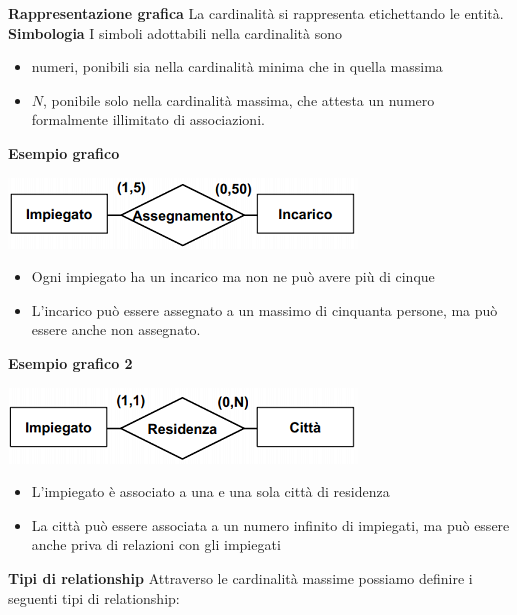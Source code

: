 \noindent \textbf{Rappresentazione grafica} La cardinalità si rappresenta etichettando le entità.\\
\textbf{Simbologia} I simboli adottabili nella cardinalità sono
\begin{itemize}
	\item numeri, ponibili sia nella cardinalità minima che in quella massima
	\item $N$, ponibile solo nella cardinalità massima, che attesta un numero formalmente illimitato di associazioni.
\end{itemize}
\textbf{Esempio grafico} \begin{center}\includegraphics{images/14.PNG}\end{center}
\begin{itemize}
	\item Ogni impiegato ha un incarico ma non ne può avere più di cinque
	\item L'incarico può essere assegnato a un massimo di cinquanta persone, ma può essere anche non assegnato.
\end{itemize}
\textbf{Esempio grafico 2} \begin{center}\includegraphics{images/15.PNG}\end{center}
\begin{itemize}
	\item L'impiegato è associato a una e una sola città di residenza
	\item La città può essere associata a un numero infinito di impiegati, ma può essere anche priva di relazioni con gli impiegati
\end{itemize}
\textbf{Tipi di relationship} Attraverso le cardinalità massime possiamo definire i seguenti tipi di relationship:
